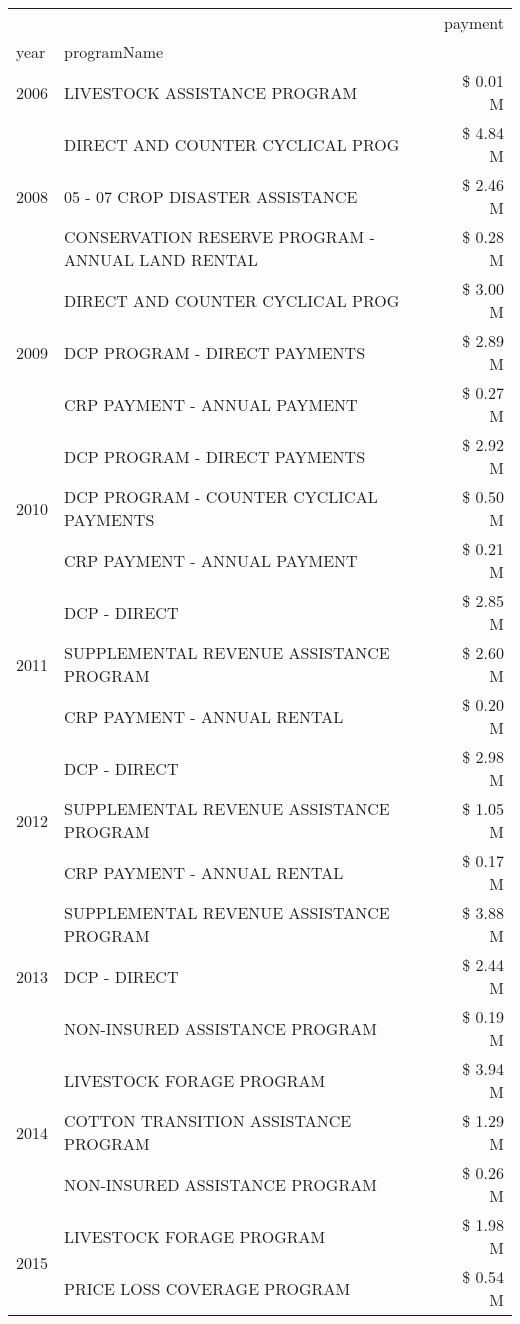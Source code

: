 \begin{tabular}{llr}
\toprule
 &  & payment \\
year & programName &  \\
\midrule
2006 & LIVESTOCK ASSISTANCE PROGRAM & \$ 0.01 M \\
\cline{1-3}
\multirow[t]{3}{*}{2008} & DIRECT AND COUNTER CYCLICAL PROG & \$ 4.84 M \\
 & 05 - 07 CROP DISASTER ASSISTANCE & \$ 2.46 M \\
 & CONSERVATION RESERVE PROGRAM - ANNUAL LAND RENTAL & \$ 0.28 M \\
\cline{1-3}
\multirow[t]{3}{*}{2009} & DIRECT AND COUNTER CYCLICAL PROG & \$ 3.00 M \\
 & DCP PROGRAM - DIRECT PAYMENTS & \$ 2.89 M \\
 & CRP PAYMENT - ANNUAL PAYMENT & \$ 0.27 M \\
\cline{1-3}
\multirow[t]{3}{*}{2010} & DCP PROGRAM - DIRECT PAYMENTS & \$ 2.92 M \\
 & DCP PROGRAM - COUNTER CYCLICAL PAYMENTS & \$ 0.50 M \\
 & CRP PAYMENT - ANNUAL PAYMENT & \$ 0.21 M \\
\cline{1-3}
\multirow[t]{3}{*}{2011} & DCP - DIRECT & \$ 2.85 M \\
 & SUPPLEMENTAL REVENUE ASSISTANCE PROGRAM & \$ 2.60 M \\
 & CRP PAYMENT - ANNUAL RENTAL & \$ 0.20 M \\
\cline{1-3}
\multirow[t]{3}{*}{2012} & DCP - DIRECT & \$ 2.98 M \\
 & SUPPLEMENTAL REVENUE ASSISTANCE PROGRAM & \$ 1.05 M \\
 & CRP PAYMENT - ANNUAL RENTAL & \$ 0.17 M \\
\cline{1-3}
\multirow[t]{3}{*}{2013} & SUPPLEMENTAL REVENUE ASSISTANCE PROGRAM & \$ 3.88 M \\
 & DCP - DIRECT & \$ 2.44 M \\
 & NON-INSURED ASSISTANCE PROGRAM & \$ 0.19 M \\
\cline{1-3}
\multirow[t]{3}{*}{2014} & LIVESTOCK FORAGE PROGRAM & \$ 3.94 M \\
 & COTTON TRANSITION ASSISTANCE PROGRAM & \$ 1.29 M \\
 & NON-INSURED ASSISTANCE PROGRAM & \$ 0.26 M \\
\cline{1-3}
\multirow[t]{3}{*}{2015} & LIVESTOCK FORAGE PROGRAM & \$ 1.98 M \\
 & PRICE LOSS COVERAGE PROGRAM & \$ 0.54 M \\

\end{tabular}
